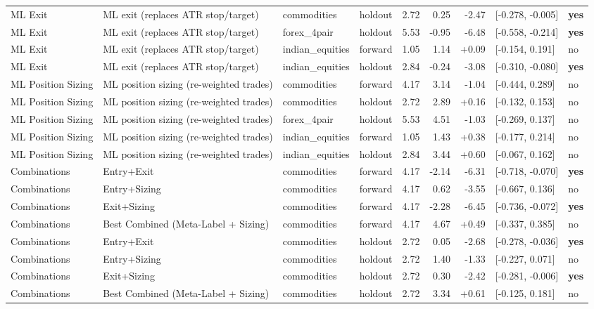 \begin{longtable}{l l l l r r r l l}
ML Exit & ML exit (replaces ATR stop/target) & commodities & holdout & 2.72 & 0.25 & -2.47 & [-0.278, -0.005] & \textbf{yes} \\
ML Exit & ML exit (replaces ATR stop/target) & forex\_4pair & holdout & 5.53 & -0.95 & -6.48 & [-0.558, -0.214] & \textbf{yes} \\
ML Exit & ML exit (replaces ATR stop/target) & indian\_equities & forward & 1.05 & 1.14 & +0.09 & [-0.154, 0.191] & no \\
ML Exit & ML exit (replaces ATR stop/target) & indian\_equities & holdout & 2.84 & -0.24 & -3.08 & [-0.310, -0.080] & \textbf{yes} \\
ML Position Sizing & ML position sizing (re-weighted trades) & commodities & forward & 4.17 & 3.14 & -1.04 & [-0.444, 0.289] & no \\
ML Position Sizing & ML position sizing (re-weighted trades) & commodities & holdout & 2.72 & 2.89 & +0.16 & [-0.132, 0.153] & no \\
ML Position Sizing & ML position sizing (re-weighted trades) & forex\_4pair & holdout & 5.53 & 4.51 & -1.03 & [-0.269, 0.137] & no \\
ML Position Sizing & ML position sizing (re-weighted trades) & indian\_equities & forward & 1.05 & 1.43 & +0.38 & [-0.177, 0.214] & no \\
ML Position Sizing & ML position sizing (re-weighted trades) & indian\_equities & holdout & 2.84 & 3.44 & +0.60 & [-0.067, 0.162] & no \\
Combinations & Entry+Exit & commodities & forward & 4.17 & -2.14 & -6.31 & [-0.718, -0.070] & \textbf{yes} \\
Combinations & Entry+Sizing & commodities & forward & 4.17 & 0.62 & -3.55 & [-0.667, 0.136] & no \\
Combinations & Exit+Sizing & commodities & forward & 4.17 & -2.28 & -6.45 & [-0.736, -0.072] & \textbf{yes} \\
Combinations & Best Combined (Meta-Label + Sizing) & commodities & forward & 4.17 & 4.67 & +0.49 & [-0.337, 0.385] & no \\
Combinations & Entry+Exit & commodities & holdout & 2.72 & 0.05 & -2.68 & [-0.278, -0.036] & \textbf{yes} \\
Combinations & Entry+Sizing & commodities & holdout & 2.72 & 1.40 & -1.33 & [-0.227, 0.071] & no \\
Combinations & Exit+Sizing & commodities & holdout & 2.72 & 0.30 & -2.42 & [-0.281, -0.006] & \textbf{yes} \\
Combinations & Best Combined (Meta-Label + Sizing) & commodities & holdout & 2.72 & 3.34 & +0.61 & [-0.125, 0.181] & no \\

\end{longtable}

